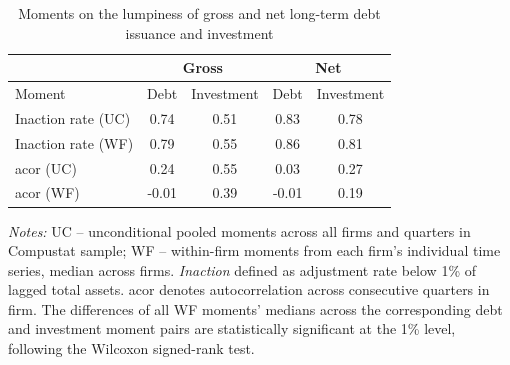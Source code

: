 \begin{table}[ht]
\centering
\caption{Moments on the lumpiness of gross and net long-term debt issuance and investment} 
\label{lumpy_mom_short}
\begin{tabular}{l|cc|cc}
  \hline \hline 
 & \multicolumn{2}{c|}{Gross} & \multicolumn{2}{c}{Net} \\ 
 \hline
  Moment & Debt & Investment & Debt & Investment \\ 
 \hline
Inaction rate (UC) & 0.74 & 0.51 & 0.83 & 0.78 \\ 
  Inaction rate (WF) & 0.79 & 0.55 & 0.86 & 0.81 \\ 
  acor (UC) & 0.24 & 0.55 & 0.03 & 0.27 \\ 
  acor (WF) & -0.01 & 0.39 & -0.01 & 0.19 \\ 
   \hline \hline
\end{tabular}

\vspace{4pt}
\begin{minipage}{\textwidth}
{\footnotesize \emph{Notes:} UC -- unconditional pooled moments across all firms and quarters in Compustat sample; WF -- within-firm moments from each firm's individual time series, median across firms. \emph{Inaction} defined as adjustment rate below 1\% of lagged total assets. acor denotes autocorrelation across consecutive quarters in firm.
The differences of all WF moments' medians across the corresponding debt and investment moment pairs are statistically significant at the 1\% level, following the Wilcoxon signed-rank test.
}
\end{minipage}

\end{table}
